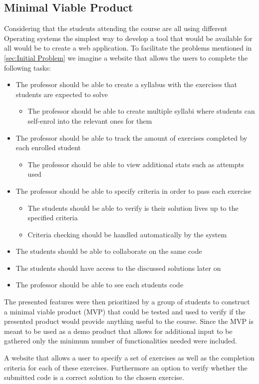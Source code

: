 \subsection{Minimal Viable Product}
Considering that the students attending the course are all using different Operating systems the simplest way to develop a tool that would be available for all would be to create a web application. To facilitate the problems mentioned in \ref{sec:Initial Problem} we imagine a website that allows the users to complete the following tasks:
\begin{itemize}
	\item The professor should be able to create a syllabus with the exercises that students are expected to solve
	\begin{itemize}
		\item The professor should be able to create multiple syllabi where students can self-enrol into the relevant ones for them
	\end{itemize}
	\item The professor should be able to track the amount of exercises completed by each enrolled student
	\begin{itemize}
		\item The professor should be able to view additional stats such as attempts used 
	\end{itemize}
	\item The professor should be able to specify criteria in order to pass each exercise 
	\begin{itemize}
		\item The students should be able to verify is their solution lives up to the specified criteria
		\item Criteria checking should be handled automatically by the system
	\end{itemize}
	\item The students should be able to collaborate on the same code
	\item The students should have access to the discussed solutions later on
	\item The professor should be able to see each students code
\end{itemize}

The presented features were then prioritized by a group of students to construct a minimal viable product (MVP) that could be tested and used to verify if the presented product would provide anything useful to the course. Since the MVP is meant to be used as a demo product that allows for additional input to be gathered only the minimum number of functionalities needed were included.

\begin{displayquote}
A website that allows a user to specify a set of exercises as well as the completion criteria for each of these exercises. Furthermore an option to verify whether the submitted code is a correct solution to the chosen exercise.
\end{displayquote}





